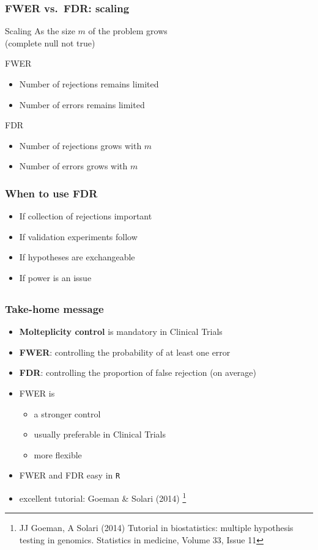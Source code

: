 \documentclass[xcolor={dvipsnames}]{beamer}
\newcommand{\bb}[1]{\begin{block}{#1}}
\newcommand{\eb}{\end{block}}
\newcommand{\bi}{\begin {itemize}}
\newcommand{\ei}{\end{itemize}}
\newcommand{\bfr}[1]{\begin{frame} \frametitle{#1}}
\begin{document}
\bfr{FWER vs.\ FDR: scaling}
  \bb{Scaling}
    As the size $m$ of the problem grows \\(complete null not true)
  \eb
  \bb{FWER}
    \bi
      \item Number of rejections remains limited
      \item Number of errors remains limited
    \ei
  \eb
  \bb{FDR}
    \bi
      \item Number of rejections grows with $m$
      \item Number of errors grows with $m$
    \ei
  \eb
\end{frame}


\bfr{When to use FDR}
    \bi
      \item If collection of rejections important
      \item If validation experiments follow
      \item If hypotheses are exchangeable
      \item If power is an issue
    \ei
\end{frame}


\subsection{}
\bfr{Take-home message}
\bi 
\item \textbf{Molteplicity control} is mandatory in Clinical Trials 
\item \textbf{FWER}: controlling the probability of at least one error
\item \textbf{FDR}:  controlling the  proportion of false rejection (on average)
\item FWER is 
\bi
\item a stronger control
\item usually preferable in Clinical Trials
\item more flexible
\ei
\item FWER and FDR  easy in {\tt R}
\item excellent tutorial: Goeman \& Solari (2014) \footnote{
JJ Goeman, A Solari (2014) Tutorial in biostatistics: multiple hypothesis testing in genomics. Statistics in medicine, Volume 33, Issue 11}
\ei
\end{frame}
\end{document}
